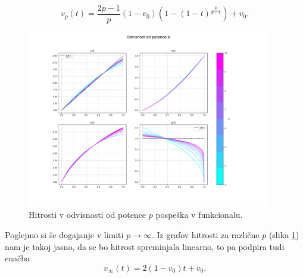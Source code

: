 \documentclass[a4paper, 12pt, slovene]{article}
\numberwithin{equation}{section}
\begin{document}
\begin{equation}
v_p(t) = \frac{2p-1}{p}(1-v_0)\left( 1-(1-t)^{\frac{p}{p-1}} \right) + v_0.
\end{equation}
\begin{figure}[H]
\centering
\includegraphics[width=0.95\textwidth]{grafi/odvisnost_p_ult.pdf}
\caption{Hitrosti v odvisnosti od potence $p$ pospeška v funkcionalu.}
\label{f:p}
\end{figure}
Poglejmo si še dogajanje v limiti $p \rightarrow \infty$. Iz grafov hitrosti za različne $p$ (slika \ref{f:p}) nam je takoj jasno, da se bo hitrost spreminjala linearno, to pa podpira tudi enačba
\begin{equation}
v_{\infty}(t) =  2(1-v_0)t + v_0.
\end{equation}
\end{document}
